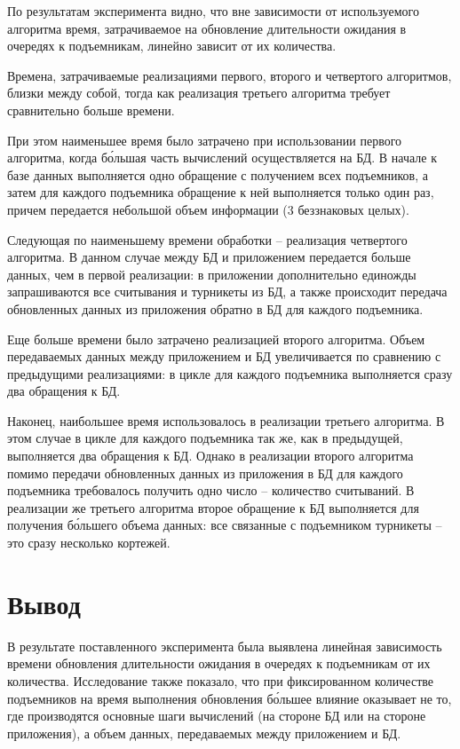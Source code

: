 По результатам эксперимента видно, что вне зависимости от используемого алгоритма время, затрачиваемое на обновление длительности ожидания в очередях к подъемникам, линейно зависит от их количества. 

Времена, затрачиваемые реализациями первого, второго и четвертого алгоритмов, близки между собой, тогда как реализация третьего алгоритма требует сравнительно больше времени.

При этом наименьшее время было затрачено при использовании первого алгоритма, когда б\'{о}льшая часть вычислений осуществляется на БД. В начале к базе данных выполняется одно обращение с получением всех подъемников, а затем для каждого подъемника обращение к ней выполняется только один раз, причем передается небольшой объем информации (3 беззнаковых целых).

Следующая по наименьшему времени обработки -- реализация четвертого алгоритма. В данном случае между БД и приложением передается больше данных, чем в первой реализации: в приложении дополнительно единожды запрашиваются все считывания и турникеты из БД, а также происходит передача обновленных данных из приложения обратно в БД для каждого подъемника.

Еще больше времени было затрачено реализацией второго алгоритма. Объем передаваемых данных между приложением и БД увеличивается по сравнению с предыдущими реализациями: в цикле для каждого подъемника выполняется сразу два обращения к БД. 

Наконец, наибольшее время использовалось в реализации третьего алгоритма. В этом случае в цикле для каждого подъемника так же, как в предыдущей, выполняется два обращения к БД. Однако в реализации второго алгоритма помимо передачи обновленных данных из приложения в БД для каждого подъемника требовалось получить одно число -- количество считываний. В реализации же третьего алгоритма второе обращение к БД выполняется для получения б\'{о}льшего объема данных: все связанные с подъемником турникеты -- это сразу несколько кортежей.

\section*{Вывод}

В результате поставленного эксперимента была выявлена линейная зависимость времени обновления длительности ожидания в очередях к подъемникам от их количества. Исследование также показало, что при фиксированном количестве подъемников на время выполнения обновления б\'{о}льшее влияние оказывает не то, где производятся основные шаги вычислений (на стороне БД или на стороне приложения), а объем данных, передаваемых между приложением и БД.

